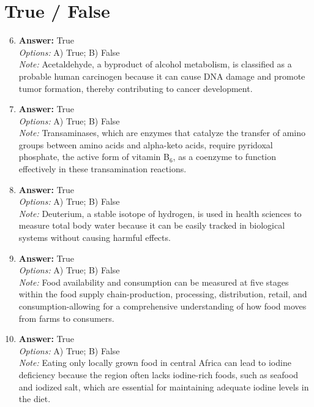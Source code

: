 \documentclass[12pt]{article}
\begin{document}
\section*{True / False}
\begin{enumerate}[label=\arabic*.]
\setcounter{enumi}{5}
\item \textbf{Answer:} True
\\ \textit{Options:} A) True; B) False
\\ \textit{Note:} Acetaldehyde, a byproduct of alcohol metabolism, is classified as a probable human carcinogen because it can cause DNA damage and promote tumor formation, thereby contributing to cancer development.
\item \textbf{Answer:} True
\\ \textit{Options:} A) True; B) False
\\ \textit{Note:} Transaminases, which are enzymes that catalyze the transfer of amino groups between amino acids and alpha-keto acids, require pyridoxal phosphate, the active form of vitamin B$_{6}$, as a coenzyme to function effectively in these transamination reactions.
\item \textbf{Answer:} True
\\ \textit{Options:} A) True; B) False
\\ \textit{Note:} Deuterium, a stable isotope of hydrogen, is used in health sciences to measure total body water because it can be easily tracked in biological systems without causing harmful effects.
\item \textbf{Answer:} True
\\ \textit{Options:} A) True; B) False
\\ \textit{Note:} Food availability and consumption can be measured at five stages within the food supply chain-production, processing, distribution, retail, and consumption-allowing for a comprehensive understanding of how food moves from farms to consumers.
\item \textbf{Answer:} True
\\ \textit{Options:} A) True; B) False
\\ \textit{Note:} Eating only locally grown food in central Africa can lead to iodine deficiency because the region often lacks iodine-rich foods, such as seafood and iodized salt, which are essential for maintaining adequate iodine levels in the diet.
\end{enumerate}
\end{document}

